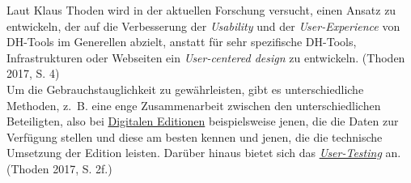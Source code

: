 \documentclass{article}
\begin{document}
        Laut Klaus Thoden wird in der aktuellen Forschung versucht, einen Ansatz zu entwickeln, der auf die Verbesserung der \emph{Usability} und der \emph{User-Experience} von DH-Tools im Generellen abzielt, anstatt für sehr spezifische DH-Tools, Infrastrukturen oder Webseiten ein \emph{User-centered design} zu entwickeln. (Thoden 2017, S. 4)\\
            
        Um die Gebrauchstauglichkeit zu gewährleisten, gibt es unterschiedliche Methoden, z. B. eine enge Zusammenarbeit zwischen den unterschiedlichen Beteiligten, also bei \href{http://gams.uni-graz.at/o:konde.59}{Digitalen Editionen} beispielsweise jenen, die die Daten zur Verfügung stellen und diese am besten kennen und jenen, die die technische Umsetzung der Edition leisten. Darüber hinaus bietet sich das \emph{\href{http://gams.uni-graz.at/o:konde.206}{User-Testing}} an. (Thoden 2017, S. 2f.)\\
            
\end{document}
